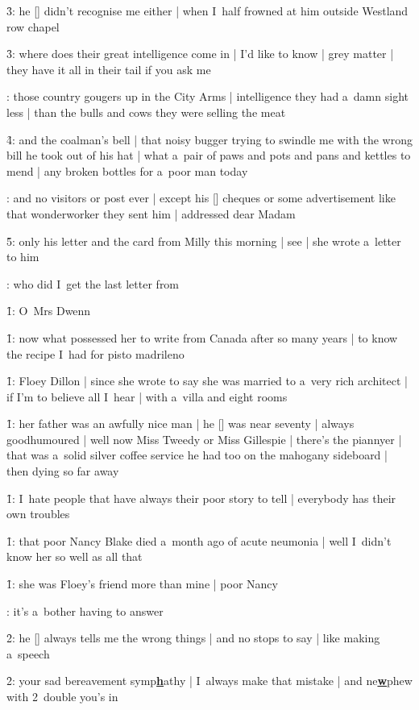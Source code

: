 \f3:
he [\student] didn't recognise me either |
when I~half frowned at him outside Westland row chapel

\f3:
where does their great intelligence come in |
I'd like to know |
grey matter |
they have it all in their tail if you ask me

:
those country gougers up in the City Arms |
intelligence they had a~damn sight less |
than the bulls and cows they were selling the meat

\f4:
and the coalman's bell |
that noisy bugger trying to swindle me with the wrong bill
he took out of his hat |
what a~pair of paws and pots and pans and kettles to mend |
any broken bottles for a~poor man today

:
and no visitors or post ever |
except his [\bloom] cheques or some advertisement like that wonderworker they sent him |
addressed dear Madam

\f5:
only his letter and the card from Milly this morning |
see |
she wrote a~letter to him

:
who did I~get the last letter from

\f1:
O~Mrs Dwenn

\f1:
now what possessed her to write from Canada after so many years |
to know the recipe I~had for pisto madrileno

\f1:
Floey Dillon |
since she wrote to say she was married to a~very rich architect |
if I'm to believe all I~hear |
with a~villa and eight rooms

\f1:
her father was an awfully nice man |
he [\dillon] was near seventy |
always goodhumoured |
well now Miss Tweedy or Miss Gillespie |
there's the piannyer |
that was a~solid silver coffee service he had too on the mahogany sideboard |
then dying so far away

\f1:
I~hate people that have always their poor story to tell |
everybody has their own troubles

\f1:
that poor Nancy Blake died a~month ago of acute neumonia |
well I~didn't know her so well as all that

\f1:
she was Floey's friend more than mine |
poor Nancy

:
it's a~bother having to answer

\f2:
he [\bloom] always tells me the wrong things |
and no stops to say |
like making a~speech

\f2:
your sad bereavement symp{\textbf{\underline{h}}}athy |
I~always make that mistake |
and ne{\textbf{\underline{w}}}phew with 2~double you's in

